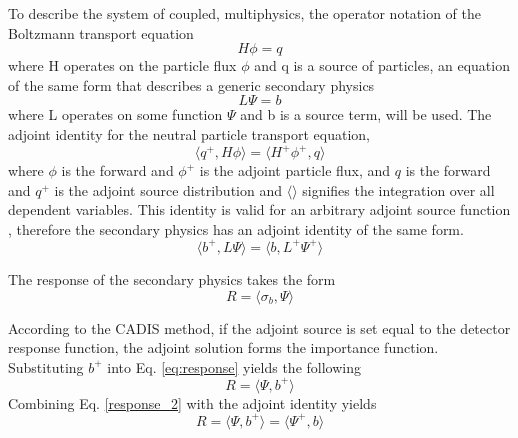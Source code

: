 To describe the system of coupled, multiphysics,
the operator notation of the Boltzmann transport equation
\begin{equation}
	H\phi = q
\end{equation}
where H operates on the particle flux $\phi$ and q is a source of particles, 
an equation of the same form that describes a generic secondary physics 
\begin{equation}
	L\Psi = b
\end{equation}
where L operates on some function $\Psi$ and b is a source term, will be used.
The adjoint identity for the neutral particle transport
equation, 
 \begin{equation}\label{eq:adj_identity}
		\langle q^{+}, H\phi \rangle =
		\langle H^{+}\phi^{+}, q \rangle
 \end{equation}
where $\phi$ is the forward and 
$\phi^{+}$ is the adjoint particle flux, and
$q$ is the forward and 
$q^{+}$ is the adjoint source distribution and $\langle \rangle$ signifies the
integration over all dependent variables.
This identity is valid for an arbitrary adjoint source function
\cite{l_m}, therefore the secondary physics has an adjoint identity of the same
form.
\begin{equation}\label{eq:adj_2_identity}
	\langle b^{+}, L\Psi \rangle =
	\langle b, L^{+}\Psi^{+} \rangle 
\end{equation}

The response of the secondary physics takes the form
\begin{equation}\label{eq:response}
	R = \langle \sigma_b , \Psi \rangle
\end{equation}

According to the CADIS method, 
if the adjoint source is set equal to the detector response
function, the adjoint solution forms the importance function.
Substituting $b^{+}$ into Eq. \ref{eq:response} yields the following
 \begin{equation}\label{eq:response_2}
	 R = \langle \Psi, b^{+} \rangle 
 \end{equation}
Combining Eq. \ref{response_2} with the adjoint identity yields
 \begin{equation}\label{eq:adj_2}
	 R = \langle \Psi, b^{+} \rangle 
		=\langle \Psi^{+} , b \rangle
 \end{equation}

